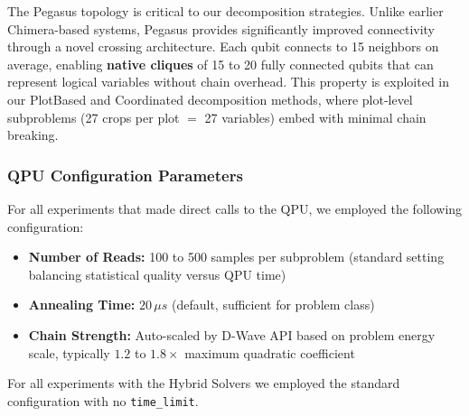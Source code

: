\documentclass{oqireport}
\begin{document}
The Pegasus topology is critical to our decomposition strategies. Unlike earlier Chimera-based systems, Pegasus provides significantly improved connectivity through a novel crossing architecture. Each qubit connects to 15 neighbors on average, enabling \textbf{native cliques} of 15 to 20 fully connected qubits that can represent logical variables without chain overhead. This property is exploited in our PlotBased and Coordinated decomposition methods, where plot-level subproblems (27 crops per plot $=$ 27 variables) embed with minimal chain breaking.

\subsubsection{QPU Configuration Parameters}

For all experiments that made direct calls to the QPU, we employed the following configuration:

\begin{itemize}
    \item \textbf{Number of Reads:} 100 to 500 samples per subproblem (standard setting balancing statistical quality versus QPU time)
    \item \textbf{Annealing Time:} $20\,\mu s$ (default, sufficient for problem class)
    \item \textbf{Chain Strength:} Auto-scaled by D-Wave API based on problem energy scale, typically $1.2$ to $1.8\times$ maximum quadratic coefficient
\end{itemize}

For all experiments with the Hybrid Solvers we employed the standard configuration with no \texttt{time\_limit}.
\end{document}
